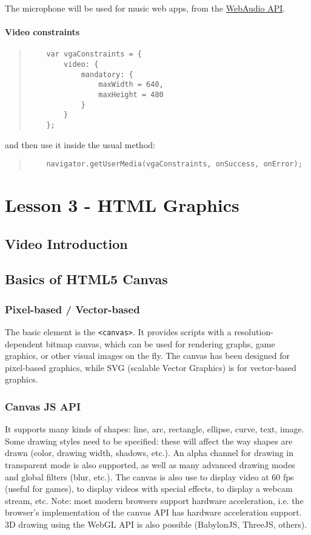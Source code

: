 \documentclass[a4paper,11pt]{book}
\begin{document}
	The microphone will be used for music web apps, from the \href{http://www.w3.org/TR/webaudio/}{WebAudio API}.
	
	\subsubsection{Video constraints}
	\begin{verse}
	\begin{verbatim}
	var vgaConstraints = {
		video: {
			mandatory: {
				maxWidth = 640,
				maxHeight = 480
			}
		}
	};
	\end{verbatim}
	\end{verse}
	and then use it inside the usual method:
	\begin{verse}
	\begin{verbatim}
	navigator.getUserMedia(vgaConstraints, onSuccess, onError);
	\end{verbatim}
	\end{verse}
	
\chapter{Lesson 3 - HTML Graphics}
\section{Video Introduction}
\section{Basics of HTML5 Canvas}
	\subsection{Pixel-based / Vector-based}
	The basic element is the \texttt{<canvas>}. It provides scripts with a resolution-dependent
	bitmap canvas, which can be used for rendering graphs, game graphics, or other visual images
	on the fly. The canvas has been designed for pixel-based graphics, while SVG (scalable
	Vector Graphics) is for vector-based graphics.
	
	\subsection{Canvas JS API}
	It supports many kinds of shapes: line, arc, rectangle, ellipse, curve, text, image.
	Some drawing styles need to be specified: these will affect the way shapes are drawn
	(color, drawing width, shadows, etc.). An alpha channel for drawing in transparent mode
	is also supported, as well as many advanced drawing modes and global filters (blur, etc.).
	The canvas is also use to display video at 60 fps (useful for games), to display videos
	with special effects, to display a webcam stream, etc. Note: most modern browsers support
	hardware acceleration, i.e. the browser's implementation of the canvas API has hardware
	acceleration support. 3D drawing using the WebGL API is also possible (BabylonJS, ThreeJS,
	others).
\end{document}
